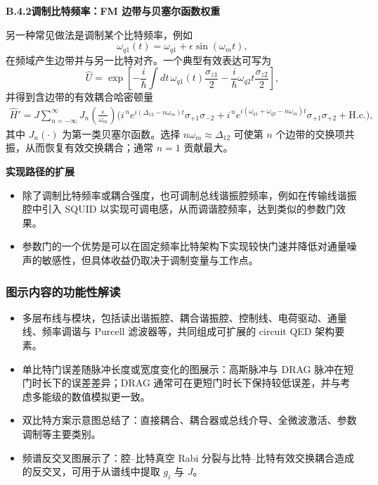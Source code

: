 \documentclass[12pt,a4paper,oneside]{ctexbook}
\begin{document}
\noindent\textbf{B.4.2\quad 调制比特频率：FM 边带与贝塞尔函数权重}

另一种常见做法是调制某个比特频率，例如
\[
  \omega_{q1}(t)=\omega_{q1}+\epsilon\sin(\omega_m t),
\]
在频域产生边带并与另一比特对齐。一个典型有效表达可写为
\begin{equation}
  \hat U
  =\exp\!\left[
    -\frac{i}{\hbar}\int dt\,
    \omega_{q1}(t)\frac{\sigma_{z1}}{2}
    -\frac{i}{\hbar}\omega_{q2}t\frac{\sigma_{z2}}{2}
  \right],
  \tag{152}
\end{equation}
并得到含边带的有效耦合哈密顿量
\begin{align}
  \hat H'
  =J\sum_{n=-\infty}^{\infty}J_n\!\left(\frac{\epsilon}{\omega_m}\right)
  \Big(
    i^{\,n}e^{i(\Delta_{12}-n\omega_m)t}\sigma_{+1}\sigma_{-2}
    +i^{\,n}e^{i(\omega_{q1}+\omega_{q2}-n\omega_m)t}\sigma_{+1}\sigma_{+2}
    +\mathrm{H.c.}
  \Big),
  \tag{153}
\end{align}
其中 $J_n(\cdot)$ 为第一类贝塞尔函数。选择 $n\omega_m\approx \Delta_{12}$ 可使第 $n$ 个边带的交换项共振，从而恢复有效交换耦合；通常 $n=1$ 贡献最大。

\noindent\textbf{实现路径的扩展}

\begin{itemize}
  \item 除了调制比特频率或耦合强度，也可调制总线谐振腔频率，例如在传输线谐振腔中引入 SQUID 以实现可调电感，从而调谐腔频率，达到类似的参数门效果。
  \item 参数门的一个优势是可以在固定频率比特架构下实现较快门速并降低对通量噪声的敏感性，但具体收益仍取决于调制变量与工作点。
\end{itemize}

\subsubsection{图示内容的功能性解读}

\begin{itemize}
  \item 多层布线与模块，包括读出谐振腔、耦合谐振腔、控制线、电荷驱动、通量线、频率调谐与 Purcell 滤波器等，共同组成可扩展的 circuit QED 架构要素。
  \item 单比特门误差随脉冲长度或宽度变化的图展示：高斯脉冲与 DRAG 脉冲在短门时长下的误差差异；DRAG 通常可在更短门时长下保持较低误差，并与考虑多能级的数值模拟更一致。
  \item 双比特方案示意图总结了：直接耦合、耦合器或总线介导、全微波激活、参数调制等主要类别。
  \item 频谱反交叉图展示了：腔--比特真空 Rabi 分裂与比特--比特有效交换耦合造成的反交叉，可用于从谱线中提取 $g_i$ 与 $J$。
\end{itemize}
\end{document}
